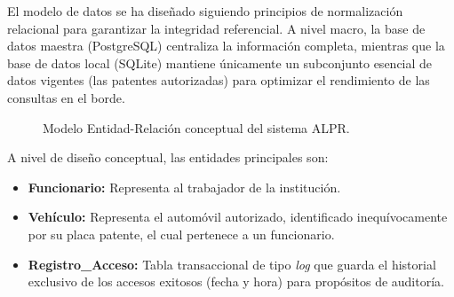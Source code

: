 El modelo de datos se ha diseñado siguiendo principios de normalización relacional para garantizar la integridad referencial. A nivel macro, la base de datos maestra (PostgreSQL) centraliza la información completa, mientras que la base de datos local (SQLite) mantiene únicamente un subconjunto esencial de datos vigentes (las patentes autorizadas) para optimizar el rendimiento de las consultas en el borde.

\vspace{0.5cm}
\begin{figure}[H]
\centering
{}
\caption{Modelo Entidad-Relación conceptual del sistema ALPR.}
\label{fig:modelo_er}
\end{figure}

A nivel de diseño conceptual, las entidades principales son:
\begin{itemize}
    \item \textbf{Funcionario:} Representa al trabajador de la institución.
    \item \textbf{Vehículo:} Representa el automóvil autorizado, identificado inequívocamente por su placa patente, el cual pertenece a un funcionario.
    \item \textbf{Registro\_Acceso:} Tabla transaccional de tipo \textit{log} que guarda el historial exclusivo de los accesos exitosos (fecha y hora) para propósitos de auditoría.
\end{itemize}

